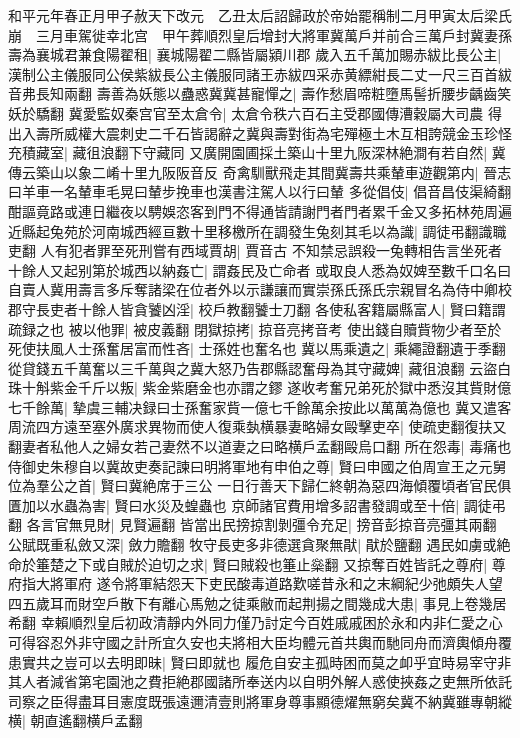 和平元年春正月甲子赦天下改元　乙丑太后詔歸政於帝始罷稱制二月甲寅太后梁氏崩　三月車駕徙幸北宫　甲午葬順烈皇后增封大將軍冀萬戶并前合三萬戶封冀妻孫壽為襄城君兼食陽翟租|{
	襄城陽翟二縣皆屬潁川郡}
歲入五千萬加賜赤紱比長公主|{
	漢制公主儀服同公侯紫紱長公主儀服同諸王赤紱四采赤黄縹紺長二丈一尺三百首紱音弗長知兩翻}
壽善為妖態以蠱惑冀冀甚寵憚之|{
	壽作愁眉啼粧墮馬髻折腰步齲齒笑妖於驕翻}
冀愛監奴秦宫官至太倉令|{
	太倉令秩六百石主受郡國傳漕穀屬大司農}
得出入壽所威權大震刺史二千石皆謁辭之冀與壽對街為宅殫極土木互相誇競金玉珍怪充積藏室|{
	藏徂浪翻下守藏同}
又廣開園圃採土築山十里九阪深林絶澗有若自然|{
	冀傳云築山以象二崤十里九阪阪音反}
奇禽馴獸飛走其間冀壽共乘輦車遊觀第内|{
	晉志曰羊車一名輦車毛晃曰輦步挽車也漢書注駕人以行曰輦}
多從倡伎|{
	倡音昌伎渠綺翻}
酣謳竟路或連日繼夜以騁娛恣客到門不得通皆請謝門者門者累千金又多拓林苑周遍近縣起兔苑於河南城西經亘數十里移檄所在調發生兔刻其毛以為識|{
	調徒弔翻識職吏翻}
人有犯者罪至死刑嘗有西域賈胡|{
	賈音古}
不知禁忌誤殺一兔轉相告言坐死者十餘人又起别第於城西以納姦亡|{
	謂姦民及亡命者}
或取良人悉為奴婢至數千口名曰自賣人冀用壽言多斥奪諸梁在位者外以示謙讓而實崇孫氏孫氏宗親冒名為侍中卿校郡守長吏者十餘人皆貪饕凶淫|{
	校戶教翻饕士刀翻}
各使私客籍屬縣富人|{
	賢曰籍謂疏録之也}
被以他罪|{
	被皮義翻}
閉獄掠拷|{
	掠音亮拷音考}
使出錢自贖貲物少者至於死使扶風人士孫奮居富而性吝|{
	士孫姓也奮名也}
冀以馬乘遺之|{
	乘繩證翻遺于季翻}
從貸錢五千萬奮以三千萬與之冀大怒乃告郡縣認奮母為其守藏婢|{
	藏徂浪翻}
云盜白珠十斛紫金千斤以叛|{
	紫金紫磨金也亦謂之鏐}
遂收考奮兄弟死於獄中悉沒其貲財億七千餘萬|{
	摯虞三輔决録曰士孫奮家貲一億七千餘萬余按此以萬萬為億也}
冀又遣客周流四方遠至塞外廣求異物而使人復乘埶横暴妻略婦女毆擊吏卒|{
	使疏吏翻復扶又翻妻者私他人之婦女若己妻然不以道妻之曰略横戶孟翻毆烏口翻}
所在怨毒|{
	毒痛也}
侍御史朱穆自以冀故吏奏記諫曰明將軍地有申伯之尊|{
	賢曰申國之伯周宣王之元舅}
位為羣公之首|{
	賢曰冀絶席于三公}
一日行善天下歸仁終朝為惡四海傾覆頃者官民俱匱加以水蟲為害|{
	賢曰水災及蝗蟲也}
京師諸官費用增多詔書發調或至十倍|{
	調徒弔翻}
各言官無見財|{
	見賢遍翻}
皆當出民搒掠割剝彊令充足|{
	搒音彭掠音亮彊其兩翻}
公賦既重私斂又深|{
	斂力贍翻}
牧守長吏多非德選貪聚無猒|{
	猒於鹽翻}
遇民如虜或絶命於箠楚之下或自賊於迫切之求|{
	賢曰賊殺也箠止橤翻}
又掠奪百姓皆託之尊府|{
	尊府指大將軍府}
遂令將軍結怨天下吏民酸毒道路歎嗟昔永和之末綱紀少弛頗失人望四五歲耳而財空戶散下有離心馬勉之徒乘敝而起荆揚之間幾成大患|{
	事見上卷幾居希翻}
幸賴順烈皇后初政清靜内外同力僅乃討定今百姓戚戚困於永和内非仁愛之心可得容忍外非守國之計所宜久安也夫將相大臣均體元首共輿而馳同舟而濟輿傾舟覆患實共之豈可以去明即昧|{
	賢曰即就也}
履危自安主孤時困而莫之卹乎宜時易宰守非其人者減省第宅園池之費拒絶郡國諸所奉送内以自明外解人惑使挾姦之吏無所依託司察之臣得盡耳目憲度既張遠邇清壹則將軍身尊事顯德燿無窮矣冀不納冀雖專朝縱横|{
	朝直遙翻横戶孟翻}
